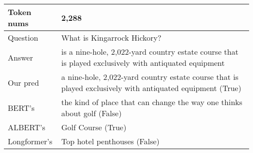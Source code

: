 \begin{table}[]
\begin{tabular}{p{56pt}|p{280pt}}
         \hline
         Token nums & 2,288 \\
         \hline
         Question & What is Kingarrock Hickory? \\
         \hline
         Answer & is a nine-hole, 2,022-yard country estate course that is played exclusively with antiquated equipment \\
         \hline
         Our pred & \textcolor[rgb]{1,0.4,0.3}{a nine-hole, 2,022-yard country estate course that is played exclusively with antiquated equipment (True)} \\
         \hline
         BERT's & \textcolor[rgb]{0.4,0.7,0.9}{the kind of place that can change the way one thinks about golf (False)} \\
         \hline
         ALBERT's & \textcolor[rgb]{0.4,0.7,0.9}{Golf Course (True)} \\
         \hline
         Longformer's & \textcolor[rgb]{0.4,0.7,0.9}{Top hotel penthouses (False)} \\
         \hline
    \end{tabular}
    \label{3-2}
\end{table}
